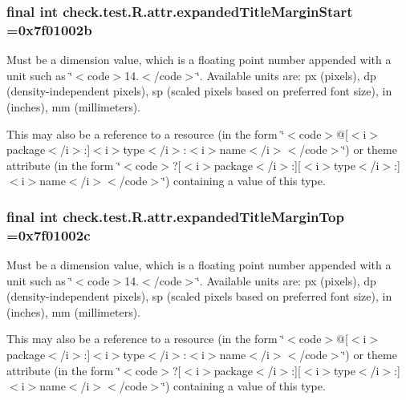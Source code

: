 \subsubsection[{expanded\+Title\+Margin\+Start}]{\setlength{\rightskip}{0pt plus 5cm}final int check.\+test.\+R.\+attr.\+expanded\+Title\+Margin\+Start =0x7f01002b\hspace{0.3cm}{\ttfamily [static]}}\label{classcheck_1_1test_1_1_r_1_1attr_a9e33e552c74573d94aec9c48307e0e40}
Must be a dimension value, which is a floating point number appended with a unit such as \char`\"{}$<$code$>$14.\+5sp$<$/code$>$\char`\"{}. Available units are\+: px (pixels), dp (density-\/independent pixels), sp (scaled pixels based on preferred font size), in (inches), mm (millimeters). 

This may also be a reference to a resource (in the form \char`\"{}$<$code$>$@\mbox{[}$<$i$>$package$<$/i$>$\+:\mbox{]}$<$i$>$type$<$/i$>$\+:$<$i$>$name$<$/i$>$$<$/code$>$\char`\"{}) or theme attribute (in the form \char`\"{}$<$code$>$?\mbox{[}$<$i$>$package$<$/i$>$\+:\mbox{]}\mbox{[}$<$i$>$type$<$/i$>$\+:\mbox{]}$<$i$>$name$<$/i$>$$<$/code$>$\char`\"{}) containing a value of this type. \hypertarget{classcheck_1_1test_1_1_r_1_1attr_a81b637fdbd35044aace13d435adf27e1}{}
\subsubsection[{expanded\+Title\+Margin\+Top}]{\setlength{\rightskip}{0pt plus 5cm}final int check.\+test.\+R.\+attr.\+expanded\+Title\+Margin\+Top =0x7f01002c\hspace{0.3cm}{\ttfamily [static]}}\label{classcheck_1_1test_1_1_r_1_1attr_a81b637fdbd35044aace13d435adf27e1}
Must be a dimension value, which is a floating point number appended with a unit such as \char`\"{}$<$code$>$14.\+5sp$<$/code$>$\char`\"{}. Available units are\+: px (pixels), dp (density-\/independent pixels), sp (scaled pixels based on preferred font size), in (inches), mm (millimeters). 

This may also be a reference to a resource (in the form \char`\"{}$<$code$>$@\mbox{[}$<$i$>$package$<$/i$>$\+:\mbox{]}$<$i$>$type$<$/i$>$\+:$<$i$>$name$<$/i$>$$<$/code$>$\char`\"{}) or theme attribute (in the form \char`\"{}$<$code$>$?\mbox{[}$<$i$>$package$<$/i$>$\+:\mbox{]}\mbox{[}$<$i$>$type$<$/i$>$\+:\mbox{]}$<$i$>$name$<$/i$>$$<$/code$>$\char`\"{}) containing a value of this type. \hypertarget{classcheck_1_1test_1_1_r_1_1attr_ae18599f9e5ed90eeaacf5b1b78f48d22}{}
